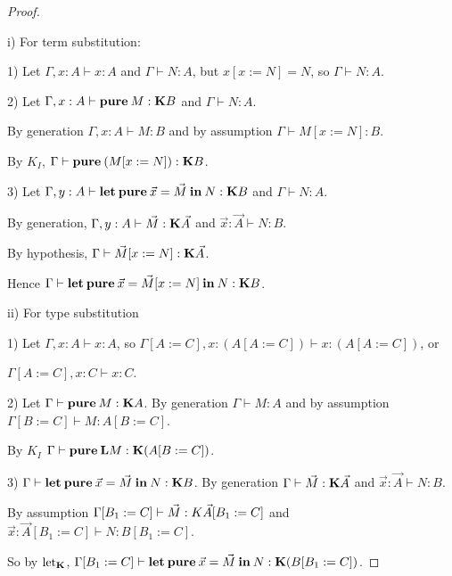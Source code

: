 \documentclass[a4paper]{article}
\begin{document}
\begin{proof}

$ $

i) For term substitution:

\vspace{\baselineskip}

1) Let $\Gamma, x : A \vdash x : A$ and $\Gamma \vdash N : A$, but $x [x := N] = N$, so $\Gamma \vdash N : A$.

2) Let $\Gamma, x : A \vdash {\bf pure \:} M : {\bf K}B$ and $\Gamma \vdash N : A$.

By generation $\Gamma, x : A \vdash M : B$ and by assumption $\Gamma \vdash M [x := N] : B$.

By $K_I$, $\Gamma \vdash {\bf pure \:} (M [x := N]) : {\bf K}B$.

3) Let $\Gamma, y : A \vdash {\bf let \: pure \:} \vec{x} = \vec{M} {\: \bf in \:} N : {\bf K} B$ and $\Gamma \vdash N : A$.

By generation, $\Gamma, y : A \vdash \vec{M} : {\bf K} \vec{A}$ and $\vec{x} : \vec{A} \vdash N : B$.

By hypothesis, $\Gamma \vdash \vec{M}[x := N] : {\bf K} \vec{A}$.

Hence $\Gamma \vdash {\bf let \: pure \:} \vec{x} = \vec{M}[x := N] {\: \bf in \:} N : {\bf K} B$.

\vspace{\baselineskip}

ii) For type substitution

\vspace{\baselineskip}

1) Let $\Gamma, x : A \vdash x : A$, so $\Gamma [A := C], x : (A[A := C]) \vdash x : (A[A := C])$, or

$\Gamma [A := C], x : C \vdash x : C$.

2) Let $\Gamma \vdash {\bf pure \:} M : {\bf K}A$. By generation $\Gamma \vdash M : A$ and by assumption $\Gamma [B := C] \vdash M : A[B := C]$.

By $K_I$ $\Gamma \vdash {\bf pure \:L} M : {\bf K}(A[B := C])$.

3) $\Gamma \vdash {\bf let \: pure \:} \vec{x} = \vec{M} {\: \bf in \:} N : {\bf K}B$. By generation $\Gamma \vdash \vec{M} : {\bf K}\vec{A}$ and $\vec{x} : \vec{A} \vdash N : B$.

By assumption $\Gamma [B_1 := C] \vdash \vec{M} : {\bf }{K}\vec{A}[B_1 := C]$ and $\vec{x} : \vec{A}[B_1 := C] \vdash N : B[B_1 := C]$.

So by $\text{let}_{{\bf K}}$, $\Gamma [B_1 := C] \vdash {\bf let \: pure \:} \vec{x} = \vec{M} {\: \bf in \:} N : {\bf K}(B[B_1 := C])$.

\end{proof}
\end{document}
